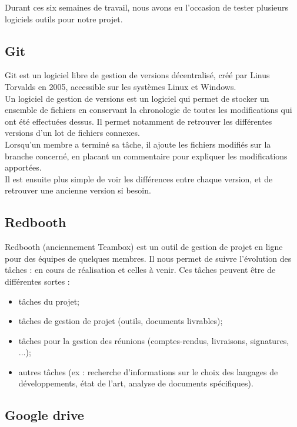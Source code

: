 Durant ces six semaines de travail, nous avons eu l'occasion de tester plusieurs logiciels outils pour notre projet.

\subsection{Git}

Git est un logiciel libre de gestion de versions décentralisé, créé par Linus Torvalds en 2005, accessible sur les systèmes Linux et Windows.\\
Un logiciel de gestion de versions est un logiciel qui permet de stocker un ensemble de fichiers en conservant la chronologie de toutes les modifications qui ont été effectuées dessus. Il permet notamment de retrouver les différentes versions d’un lot de fichiers connexes.\\
Lorsqu'un membre a terminé sa tâche, il ajoute les fichiers modifiés sur la branche concerné, en placant un commentaire pour expliquer les modifications apportées.\\
Il est ensuite plus simple de voir les différences entre chaque version, et de retrouver une ancienne version si besoin.\\

\subsection{Redbooth}

Redbooth (anciennement Teambox) est un outil de gestion de projet en ligne pour des équipes de quelques membres. Il nous permet de suivre l'évolution des tâches : en cours de réalisation et celles à venir. Ces tâches peuvent être de différentes sortes :
\begin{itemize}
\item tâches du projet;
\item tâches de gestion de projet (outils, documents livrables);
\item tâches pour la gestion des réunions (comptes-rendus, livraisons, signatures, ...);
\item autres tâches (ex : recherche d'informations sur le choix des langages de développements, état de l'art, analyse de documents spécifiques).\\
\end{itemize}

\subsection{Google drive}

